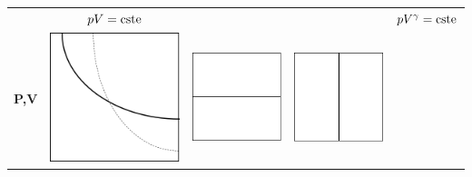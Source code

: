 \documentclass[11pt]{article}
\begin{document}
\begin{table}[!h]
\begin{center}
\begin{tabular}{|r|c|c|c|c|}
  \hline
  
  
  &$pV=\textup{cste} $
  &
  &
  &$pV^\gamma=\textup{cste}$
  \\
  
  \textbf{P,V}
     & \includegraphics[scale=0.25]{isothermepv.png} 
     & \includegraphics[scale=0.25]{isobarepv.png} 
     & \includegraphics[scale=0.25]{isochorepv.png} 

\end{tabular}
\end{center}
\end{table}
\end{document}
